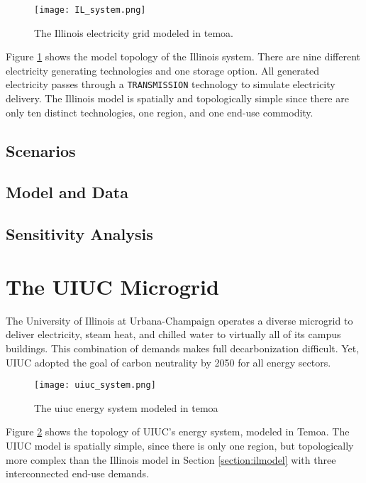 \begin{figure}[H]
  \centering
  \texttt{[image: IL\_system.png]}
  \caption{The Illinois electricity grid modeled in \gls{temoa}.}
  \label{fig:ilsys}
\end{figure}

Figure \ref{fig:ilsys} shows the model topology of the Illinois system. There
are nine different electricity generating technologies and one storage option.
All generated electricity passes through a \texttt{TRANSMISSION} technology
to simulate electricity delivery. The Illinois model is spatially and topologically
simple since there are only ten distinct technologies, one region, and one
end-use commodity.

\subsection{Scenarios}

\subsection{Model and Data}

\subsection{Sensitivity Analysis}

\section{The UIUC Microgrid}

The University of Illinois at Urbana-Champaign operates a diverse microgrid to
deliver electricity, steam heat, and chilled water to virtually all of its
campus buildings. This combination of demands makes full decarbonization difficult.
Yet, UIUC adopted the goal of carbon neutrality by 2050 for all energy sectors.

\begin{figure}[H]
  \texttt{[image: uiuc\_system.png]}
  \caption{The \gls{uiuc} energy system modeled in \gls{temoa}}
  \label{fig:uiucsys}
\end{figure}

Figure \ref{fig:uiucsys} shows the topology of UIUC’s energy system, modeled in Temoa.
The UIUC model is spatially simple, since there is only one region, but topologically
more complex than the Illinois model in Section \ref{section:ilmodel} with
three interconnected end-use demands.

